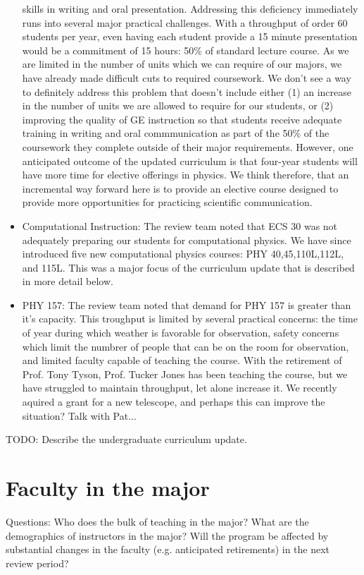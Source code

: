 \documentclass[12pt]{article}
\begin{document}
\begin{itemize}
  skills in writing and oral presentation.  Addressing this deficiency
  immediately runs into several major practical challenges.  With a
  throughput of order 60 students per year, even having each student
  provide a 15 minute presentation would be a commitment of 15 hours:
  50\% of standard lecture course.  As we are limited in the number of
  units which we can require of our majors, we have already made
  difficult cuts to required coursework.  We don't see a way to
  definitely address this problem that doesn't include either (1) an
  increase in the number of units we are allowed to require for our
  students, or (2) improving the quality of GE instruction so that
  students receive adequate training in writing and oral
  commmunication as part of the 50\% of the coursework they complete
  outside of their major requirements.  However, one anticipated
  outcome of the updated curriculum is that four-year students will
  have more time for elective offerings in physics.  We think
  therefore, that an incremental way forward here is to provide an
  elective course designed to provide more opportunities for
  practicing scientific communication.
\item Computational Instruction: The review team noted that ECS 30 was
  not adequately preparing our students for computational physics.  We
  have since introduced five new computational physics courses: PHY
  40,45,110L,112L, and 115L.  This was a major focus of the curriculum
  update that is described in more detail below.
\item PHY 157: The review team noted that demand for PHY 157 is
  greater than it's capacity.  This troughput is limited by several
  practical concerns: the time of year during which weather is
  favorable for observation, safety concerns which limit the numbrer
  of people that can be on the room for observation, and limited
  faculty capable of teaching the course.  With the retirement of
  Prof. Tony Tyson, Prof. Tucker Jones has been teaching the course,
  but we have struggled to maintain throughput, let alone increase it.
  We recently aquired a grant for a new telescope, and perhaps this
  can improve the situation?  Talk with Pat...
\end{itemize}

{\color{red} TODO:  Describe the undergraduate curriculum update.}

\section{Faculty in the major}
{\color{red} Questions: Who does the bulk of teaching in the major? What are the demographics of instructors in the major? Will the program be affected by substantial changes in the faculty (e.g. anticipated retirements) in the next review period?}
\end{document}
